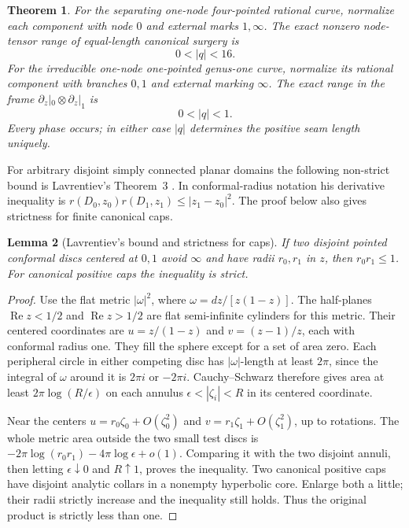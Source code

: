 \documentclass[11pt,a4paper]{article}
\newtheorem{theorem}{Theorem}[section]
\newtheorem{lemma}[theorem]{Lemma}
\theoremstyle{definition}
\begin{document}
\begin{theorem}\label{thm:small-ranges}
For the separating one-node four-pointed rational curve, normalize each component with node $0$ and external marks $1,\infty$. The exact nonzero node-tensor range of equal-length canonical surgery is
\[
 0<|q|<16.
\]
For the irreducible one-node one-pointed genus-one curve, normalize its rational component with branches $0,1$ and external marking $\infty$. The exact range in the frame $\partial_z|_0\otimes\partial_z|_1$ is
\[
 0<|q|<1.
\]
Every phase occurs; in either case $|q|$ determines the positive seam length uniquely.
\end{theorem}

For arbitrary disjoint simply connected planar domains the following non-strict bound is Lavrentiev's Theorem~3 \cite[\S2, pp.~169--173]{Lavrentiev}. In conformal-radius notation his derivative inequality is $r(D_0,z_0)r(D_1,z_1)\le|z_1-z_0|^2$. The proof below also gives strictness for finite canonical caps.

\begin{lemma}[Lavrentiev's bound and strictness for caps]\label{lem:two-domain}
If two disjoint pointed conformal discs centered at $0,1$ avoid $\infty$ and have radii $r_0,r_1$ in $z$, then $r_0r_1\le1$. For canonical positive caps the inequality is strict.
\end{lemma}
\begin{proof}
Use the flat metric $|\omega|^2$, where $\omega=dz/[z(1-z)]$. The half-planes $\operatorname{Re}z<1/2$ and $\operatorname{Re}z>1/2$ are flat semi-infinite cylinders for this metric. Their centered coordinates are $u=z/(1-z)$ and $v=(z-1)/z$, each with conformal radius one. They fill the sphere except for a set of area zero. Each peripheral circle in either competing disc has $|\omega|$-length at least $2\pi$, since the integral of $\omega$ around it is $2\pi i$ or $-2\pi i$. Cauchy--Schwarz therefore gives area at least $2\pi\log(R/\epsilon)$ on each annulus $\epsilon<|\zeta_i|<R$ in its centered coordinate.

Near the centers $u=r_0\zeta_0+O(\zeta_0^2)$ and $v=r_1\zeta_1+O(\zeta_1^2)$, up to rotations. The whole metric area outside the two small test discs is
$-2\pi\log(r_0r_1)-4\pi\log\epsilon+o(1)$.
Comparing it with the two disjoint annuli, then letting $\epsilon\downarrow0$ and $R\uparrow1$, proves the inequality. Two canonical positive caps have disjoint analytic collars in a nonempty hyperbolic core. Enlarge both a little; their radii strictly increase and the inequality still holds. Thus the original product is strictly less than one.
\end{proof}
\end{document}

